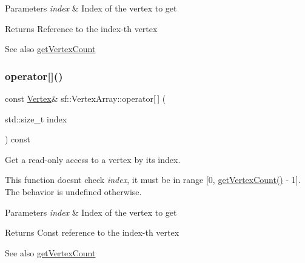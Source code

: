 \begin{DoxyParams}{Parameters}
{\em index} & Index of the vertex to get\\
\hline
\end{DoxyParams}
\begin{DoxyReturn}{Returns}
Reference to the index-\/th vertex
\end{DoxyReturn}
\begin{DoxySeeAlso}{See also}
\hyperlink{classsf_1_1_vertex_array_abda90e8d841a273d93164f0c0032bd8d}{get\+Vertex\+Count} 
\end{DoxySeeAlso}
\mbox{\label{classsf_1_1_vertex_array_a6bfcf91c01c754e86ee8b44b6c79441b}} 
\subsubsection{\texorpdfstring{operator[]()}{operator[]()}\hspace{0.1cm}{\footnotesize\ttfamily [2/2]}}
{\footnotesize\ttfamily const \hyperlink{classsf_1_1_vertex}{Vertex}\& sf\+::\+Vertex\+Array\+::operator\mbox{[}$\,$\mbox{]} (\begin{DoxyParamCaption}\item[{std\+::size\+\_\+t}]{index }\end{DoxyParamCaption}) const}



Get a read-\/only access to a vertex by its index. 

This function doesn\textquotesingle{}t check {\itshape index}, it must be in range \mbox{[}0, \hyperlink{classsf_1_1_vertex_array_abda90e8d841a273d93164f0c0032bd8d}{get\+Vertex\+Count()} -\/ 1\mbox{]}. The behavior is undefined otherwise.


\begin{DoxyParams}{Parameters}
{\em index} & Index of the vertex to get\\
\hline
\end{DoxyParams}
\begin{DoxyReturn}{Returns}
Const reference to the index-\/th vertex
\end{DoxyReturn}
\begin{DoxySeeAlso}{See also}
\hyperlink{classsf_1_1_vertex_array_abda90e8d841a273d93164f0c0032bd8d}{get\+Vertex\+Count} 
\end{DoxySeeAlso}
\mbox{\label{classsf_1_1_vertex_array_a0c0fe239e8f9a54e64d3bbc96bf548c0}} 
